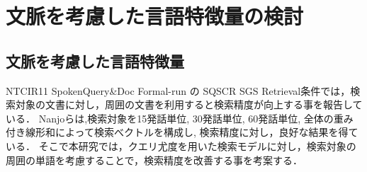 \chapter{文脈を考慮した言語特徴量の検討}

\section{文脈を考慮した言語特徴量}


NTCIR11 SpokenQuery\&Doc Formal-run の SQSCR SGS Retrieval条件では，検索対象の文書に対し，周囲の文書を利用すると検索精度が向上する事を報告している．
Nanjoら\cite{nanjo}は,検索対象を15発話単位, 30発話単位, 60発話単位, 全体の重み付き線形和によって検索べクトルを構成し, 検索精度に対し，良好な結果を得ている．
そこで本研究では，クエリ尤度を用いた検索モデルに対し，検索対象の周囲の単語を考慮することで，検索精度を改善する事を考案する．




